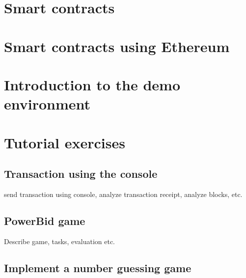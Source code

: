 \documentclass[a4paper]{article}
\begin{document}
\section{Smart contracts}


\section{Smart contracts using Ethereum}


\section{Introduction to the demo environment}

\section{Tutorial exercises}

\subsection{Transaction using the console}
send transaction using console, analyze transaction receipt, analyze blocks, etc.

\subsection{PowerBid game}
Describe game, tasks, evaluation etc.

\subsection{Implement a number guessing game}
\end{document}
